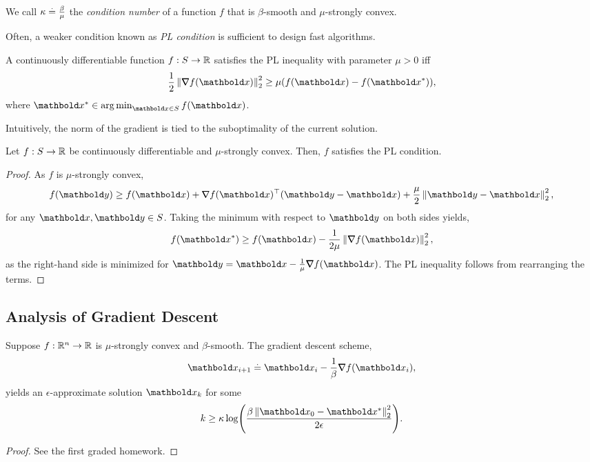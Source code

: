 \begin{defn} We call $\kappa \overset{.}{=} \frac{\beta}{\mu}$ the \emph{condition number} of a function $f$ that is $\beta$-smooth and $\mu$-strongly convex.
\end{defn}

Often, a weaker condition known as \emph{PL condition} is sufficient to design fast algorithms.

\begin{defn} A continuously differentiable function $f: S \to \mathbb{R}$ satisfies the PL inequality with parameter $\mu > 0$ iff \begin{align}
    \frac{1}{2}\norm{\grad f(\vx)}_2^2 \geq \mu (f(\vx) - f(\s{\vx})),
\end{align} where $\s{\vx} \in \argmin_{\vx \in \sS} f(\vx)$.
\end{defn}\noindent Intuitively, the norm of the gradient is tied to the suboptimality of the current solution.

\begin{lem}
Let $f: S \to \mathbb{R}$ be continuously differentiable and $\mu$-strongly convex. Then, $f$ satisfies the PL condition.
\end{lem}
\begin{proof}
As $f$ is $\mu$-strongly convex, \begin{align*}
    f(\vy) \geq f(\vx) + \trans{\grad f(\vx)}(\vy - \vx) + \frac{\mu}{2}\norm{\vy - \vx}_2^2,
\end{align*} for any $\vx, \vy \in \sS$. Taking the minimum with respect to $\vy$ on both sides yields, \begin{align*}
    f(\s{\vx}) \geq f(\vx) - \frac{1}{2\mu}\norm{\grad f(\vx)}_2^2,
\end{align*} as the right-hand side is minimized for $\vy = \vx - \frac{1}{\mu}\grad f(\vx)$. The PL inequality follows from rearranging the terms.
\end{proof}

\subsection{Analysis of Gradient Descent}

\begin{thm} Suppose $f: \mathbb{R}^n \to \mathbb{R}$ is $\mu$-strongly convex and $\beta$-smooth. The gradient descent scheme, \begin{align}
    \vx_{i+1} \defeq \vx_i - \frac{1}{\beta}\grad f(\vx_i),
\end{align} yields an $\epsilon$-approximate solution $\vx_k$ for some \begin{align*}
    k \geq \kappa\log\parentheses*{\frac{\beta\norm{\vx_0 - \s{\vx}}_2^2}{2\epsilon}}.
\end{align*}
\end{thm}
\begin{proof}
See the first graded homework.
\end{proof}

